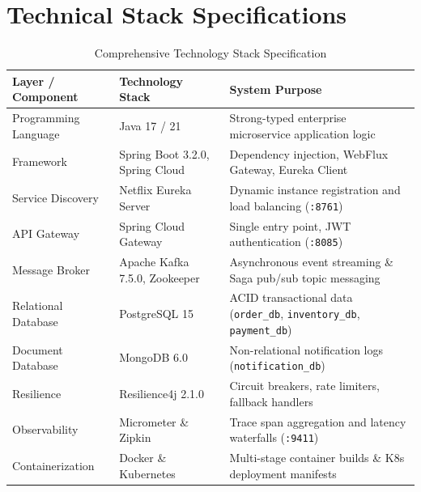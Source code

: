 \documentclass[11pt,a4paper]{article}
\begin{document}
\vspace{0.3cm}

\section{Technical Stack Specifications}

\begin{table}[htbp]
\centering
\caption{Comprehensive Technology Stack Specification}
\label{tab:techstack}
\begin{tabular}{lll}
\toprule
\textbf{Layer / Component} & \textbf{Technology Stack} & \textbf{System Purpose} \\
\midrule
Programming Language & Java 17 / 21 & Strong-typed enterprise microservice application logic \\
Framework & Spring Boot 3.2.0, Spring Cloud & Dependency injection, WebFlux Gateway, Eureka Client \\
Service Discovery & Netflix Eureka Server & Dynamic instance registration and load balancing (\texttt{:8761}) \\
API Gateway & Spring Cloud Gateway & Single entry point, JWT authentication (\texttt{:8085}) \\
Message Broker & Apache Kafka 7.5.0, Zookeeper & Asynchronous event streaming \& Saga pub/sub topic messaging \\
Relational Database & PostgreSQL 15 & ACID transactional data (\texttt{order\_db}, \texttt{inventory\_db}, \texttt{payment\_db}) \\
Document Database & MongoDB 6.0 & Non-relational notification logs (\texttt{notification\_db}) \\
Resilience & Resilience4j 2.1.0 & Circuit breakers, rate limiters, fallback handlers \\
Observability & Micrometer \& Zipkin & Trace span aggregation and latency waterfalls (\texttt{:9411}) \\
Containerization & Docker \& Kubernetes & Multi-stage container builds \& K8s deployment manifests \\
\bottomrule
\end{tabular}
\end{table}

\vspace{0.3cm}

\end{document}
